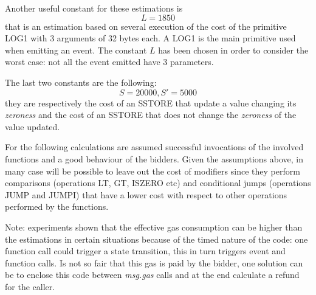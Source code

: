 \documentclass{article}
\begin{document}
Another useful constant for these estimations is $$L=1850$$ that is an estimation based on several execution of the cost of the primitive LOG1 with 3 arguments of 32 bytes each. A LOG1 is the main primitive used when emitting an event. The constant $L$ has been chosen in order to consider the worst case: not all the event emitted have 3 parameters.

The last two constants are the following: $$S=20000, S'=5000$$ they are respectively the cost of an SSTORE that update a value changing its \textit{zeroness} and the cost of an SSTORE that does not change the \textit{zeroness} of the value updated. 

For the following calculations are assumed successful invocations of the involved functions and a good behaviour of the bidders. Given the assumptions above, in many case will be possible to leave out the cost of modifiers since they perform comparisons (operations LT, GT, ISZERO etc) and conditional jumps (operations JUMP and JUMPI) that have a lower cost with respect to other operations performed by the functions.

Note: experiments shown that the effective gas consumption can be higher than the estimations in certain situations because of the timed nature of the code: one function call could trigger a state transition, this in turn triggers event and function calls. Is not so fair that this gas is paid by the bidder, one solution can be to enclose this code between \textit{msg.gas} calls and at the end calculate a refund for the caller.
\end{document}
